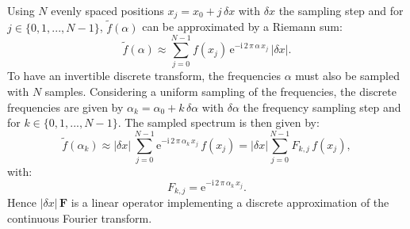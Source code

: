 \documentclass[a4paper]{article}
\newcommand*{\mathe}{\mathrm{e}}
\newcommand*{\mathi}{\mathrm{i}}
\newcommand*{\FT}[1]{\widetilde{#1}}
\begin{document}
Using $N$ evenly spaced positions $x_{j} = x_{0} + j\,δx$ with $δx$ the
sampling step and for $j ∈ \{0,1,...,N - 1\}$, $\FT{f}(α)$ can be approximated
by a Riemann sum:
\begin{equation}
  \label{eq:Fourier-transform-approx}
  \FT{f}(α) ≈ \sum_{j = 0}^{N - 1} f(x_{j})\,
  \mathe^{-\mathi\,2\,π\,α\,x_{j}}\,|δx|.
\end{equation}
To have an invertible discrete transform, the frequencies $α$ must also be
sampled with $N$ samples. Considering a uniform sampling of the frequencies,
the discrete frequencies are given by $α_{k} = α_{0} + k\,δα$ with $δα$ the
frequency sampling step and for $k ∈ \{0,1,...,N - 1\}$. The sampled spectrum
is then given by:
\begin{equation}
  \label{eq:smapled-Fourier-transform-approx}
  \FT{f}(α_{k}) ≈ |δx|\,\sum_{j = 0}^{N - 1}
  \mathe^{-\mathi\,2\,π\,α_{k}\,x_{j}}\,f(x_{j})
  = |δx| \sum_{j = 0}^{N - 1} F_{k,j}\,f(x_{j}),
\end{equation}
with:
\begin{equation}
  \label{eq:discrete-Fourier-transform-coefficients}
  F_{k,j} = \mathe^{-\mathi\,2\,π\,α_{k}\,x_{j}}.
\end{equation}
Hence $|δx|\,\mathbf{F}$ is a linear operator implementing a discrete
approximation of the continuous Fourier transform.
\end{document}
